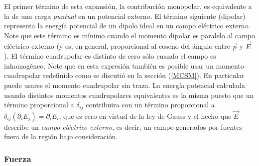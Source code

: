 El primer término de esta expansión, la contribución monopolar, es
equivalente a la de una carga \textit{puntual} en un potencial externo. El
término siguiente (dipolar) representa la energía potencial de un dipolo
ideal en un campo eléctrico externo. Note que este término es mínimo cuando
el momento dipolar es paralelo al campo eléctrico externo (y es, en general,
proporcional al coseno del ángulo entre $\vec{p}$ y $\vec{E}$). El término
cuadrupolar es distinto de cero sólo cuando el campo es inhomogéneo. Note que
en esta expresión también es posible usar un momento cuadrupolar redefinido
como se discutió en la sección (\ref{MCSM}). En particular puede usarse el
momento cuadrupolar sin traza. La energía potencial calculada usando distintos
momentos cuadrupolares equivalentes es la misma puesto que un término
proporcional a $\delta_{ij}$ contribuira con un término proporcional a
$\delta_{ij}(\partial_iE_j)=\partial_iE_i$, que es cero en virtud de la ley de
Gauss y el hecho que $\vec{E}$ describe un \textit{campo eléctrico externo},
es decir, un campo generados por fuentes fuera de la región bajo
consideración.


\subsubsection{Fuerza}  \label{ed3_3_2}

